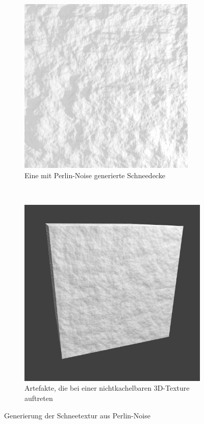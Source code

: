 \begin{figure}[h]
	\begin{subfigure}[t]{0.5\textwidth}
		\centering
		\includegraphics[width=\textwidth]{images/perlin_noise_snow}
		\caption{Eine mit Perlin-Noise generierte Schneedecke}
\label{fig:implementation_fallen_snow_perlin_noise_snow}
	\end{subfigure}
~
	\begin{subfigure}[t]{0.5\textwidth}
		\centering
		\includegraphics[width=\textwidth]{images/noise_texture_artifact}
		\caption{Artefakte, die bei einer nichtkachelbaren 3D-Texture auftreten}
\label{fig:implementation_fallen_snow_perlin_noise_artifact}
	\end{subfigure}
        \caption{Generierung der Schneetextur aus Perlin-Noise}
\end{figure}

